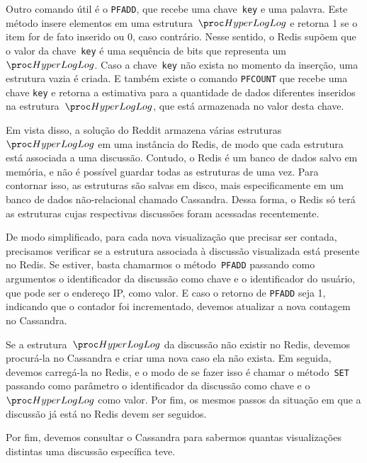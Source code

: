 Outro comando útil é o \texttt{PFADD}, que recebe uma chave~\texttt{key} e uma palavra. Este método insere elementos em 
uma estrutura~$\HLOG$ e retorna 1 se o item for de fato inserido ou 0, caso contrário. Nesse sentido, o Redis supõem que 
o valor da chave~\texttt{key} é uma sequência de bits que representa um $\HLOG$. Caso a chave~\texttt{key} não exista no 
momento da inserção, uma estrutura vazia é criada. E também existe o comando \texttt{PFCOUNT} que recebe uma chave 
\texttt{key} e retorna a estimativa para a quantidade de dados diferentes inseridos na estrutura~$\HLOG$, que está 
armazenada no valor desta chave.

Em vista disso, a solução do Reddit armazena várias estruturas~$\HLOG$ em uma instância do Redis, de modo que cada 
estrutura está associada a uma discussão. Contudo, o Redis é um banco de dados salvo em memória, e não é possível 
guardar todas as estruturas de uma vez. Para contornar isso, as estruturas são salvas em disco, mais especificamente em
um banco de dados não-relacional chamado Cassandra. Dessa forma, o Redis só terá as estruturas cujas respectivas 
discussões foram acessadas recentemente.

De modo simplificado, para cada nova visualização que precisar ser contada, precisamos verificar se a estrutura 
associada à discussão visualizada está presente no Redis. Se estiver, basta chamarmos o método~\texttt{PFADD} passando 
como argumentos o identificador da discussão como chave e o identificador do usuário, que pode ser o endereço IP, como
valor. E caso o retorno de \texttt{PFADD} seja 1, indicando que o contador foi incrementado, devemos atualizar a nova
contagem no Cassandra.

Se a estrutura~$\HLOG$ da discussão não existir no Redis, devemos procurá-la no Cassandra e criar uma nova caso ela não
exista. Em seguida, devemos carregá-la no Redis, e o modo de se fazer isso é chamar o método~\texttt{SET} passando como
parâmetro o identificador da discussão como chave e o $\HLOG$ como valor. Por fim, os mesmos passos da situação em que 
a discussão já está no Redis devem ser seguidos.

Por fim, devemos consultar o Cassandra para sabermos quantas visualizações distintas uma discussão específica teve.